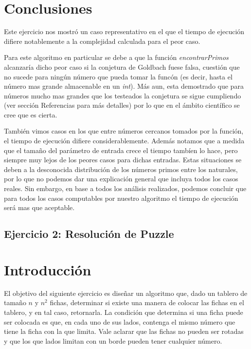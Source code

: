 \documentclass[a4paper,10pt] {article}
\begin{document}

\section*{Conclusiones}

Este ejercicio nos mostr\'o un caso representativo en el que el tiempo de ejecuci\'on difiere notablemente a la complejidad calculada para el peor caso.

Para este algoritmo en particular se debe a que la funci\'on \textit{encontrarPrimos} alcanzar\'ia dicho peor caso si la conjetura de Goldbach fuese falsa, cuesti\'on que no sucede para ning\'un n\'umero que pueda tomar la func\'on (es decir, hasta el n\'umero mas grande almacenable en un \textit{int}). M\'as aun, esta demostrado que para n\'umeros mucho mas grandes que los testeados la conjetura se sigue cumpliendo (ver secci\'on Referencias para m\'as detalles) por lo que en el \'ambito cient\'ifico se cree que es cierta.

Tambi\'en vimos casos en los que entre n\'umeros cercanos tomados por la funci\'on, el tiempo de ejecuci\'on difiere considerablemente. Adem\'as notamos que a medida que el tama\~{n}o del par\'ametro de entrada crece el tiempo tamb\'ien lo hace, pero siempre muy lejos de los peores casos para dichas entradas. Estas situaciones se deben a la desconocida distribuci\'on de los n\'umeros primos entre los naturales, por lo que no podemos dar una explicaci\'on general que incluya todos los casos reales. Sin embargo, en base a todos los an\'alisis realizados, podemos concluir que para todos los casos computables por nuestro algoritmo el tiempo de ejecuci\'on ser\'a mas que aceptable.

\bigskip

\begin{center}
\section*{Ejercicio 2: Resoluci\'on de Puzzle}
\end{center}

\bigskip
\section*{Introducci\'on}

El objetivo del siguiente ejercicio es dise\~{n}ar un algoritmo que, dado un tablero de tama\~{n}o $n$ y $n^{2}$ fichas, determinar si existe una manera de colocar las fichas en el tablero, y en tal caso, retornarla. La condici\'on que determina si una ficha puede ser colocada es que, en cada uno de sus lados, contenga el mismo n\'umero que tiene la ficha con la que limita. Vale aclarar que las fichas no pueden ser rotadas y que los que lados limitan con un borde pueden tener cualquier n\'umero.
\end{document}
